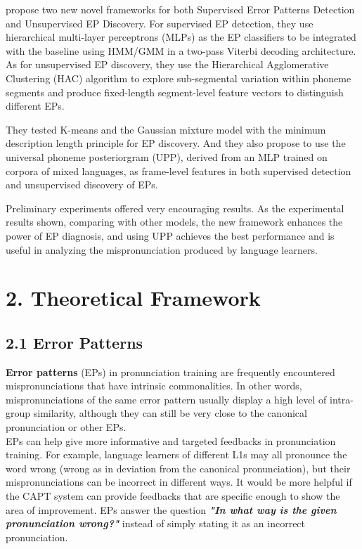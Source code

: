 \documentclass[nobib]{tufte-handout}
\begin{document}
\cite{wang2015supervised} propose two new novel frameworks for both Supervised Error Patterns Detection and Unsupervised EP Discovery.  For supervised EP detection,  they use hierarchical multi-layer perceptrons (MLPs) as the EP classifiers to be integrated with the baseline using HMM/GMM in a two-pass Viterbi decoding architecture.  As for unsupervised EP discovery, they  use the Hierarchical Agglomerative Clustering (HAC) algorithm to explore sub-segmental variation within phoneme segments and produce fixed-length segment-level feature vectors to distinguish different EPs. 

They tested K-means  and the Gaussian mixture model with the minimum description length principle  for EP discovery.  And they also propose to use the universal phoneme posteriorgram (UPP), derived from an MLP trained on corpora of mixed languages, as frame-level features in both supervised detection and unsupervised discovery of EPs. 

Preliminary experiments offered very encouraging results.  As the experimental results shown, comparing with other models, the new framework enhances the power of EP diagnosis, and using UPP achieves the best performance and is useful in analyzing the mispronunciation produced by language learners.





\bigskip
\section{2. \textbf{Theoretical Framework}}
\subsection{2.1 \textbf{Error Patterns}}

\textbf{Error patterns} (EPs) in pronunciation training are frequently encountered mispronunciations that have intrinsic commonalities. In other words, mispronunciations of the same error pattern usually display a high level of intra-group similarity, although they can still be very close to the canonical pronunciation or other EPs.\\

EPs can help give more informative and targeted feedbacks in pronunciation training. For example, language learners of different L1s may all pronounce the word wrong (wrong as in deviation from the canonical pronunciation), but their mispronunciations can be incorrect in different ways. It would be more helpful if the CAPT system can provide feedbacks that are specific enough to show the area of improvement. EPs answer the question \textbf{\textit{"In what way is the given pronunciation wrong?"}} instead of simply stating it as an incorrect pronunciation.\\
\end{document}

